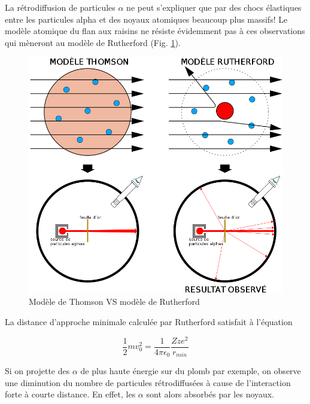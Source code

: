 La rétrodiffusion de particules $\alpha$ ne peut s’expliquer que par des chocs élastiques entre les particules alpha et des noyaux atomiques beaucoup plus massifs! Le modèle atomique du flan aux raisins ne résiste évidemment pas à ces observations qui mèneront au modèle de Rutherford (Fig. \ref{fig:mod_rutherford}).
\begin{figure}[ht]
    \centering
    \includegraphics[scale=0.25]{Images1/thom_ruth.png}
    \caption{Modèle de Thomson VS modèle de Rutherford}
    \label{fig:mod_rutherford}
\end{figure}
La distance d'approche minimale calculée par Rutherford satisfait à l'équation

$$\dfrac{1}{2}mv_0^2=\dfrac{1}{4\pi\epsilon_0}\dfrac{Zze^2}{r_{min}}$$

Si on projette des $\alpha$ de plus haute énergie sur du plomb par exemple, on observe une diminution du nombre de particules rétrodiffusées à cause de l'interaction forte à courte distance. En effet, les $\alpha$ sont alors absorbés par les noyaux.


